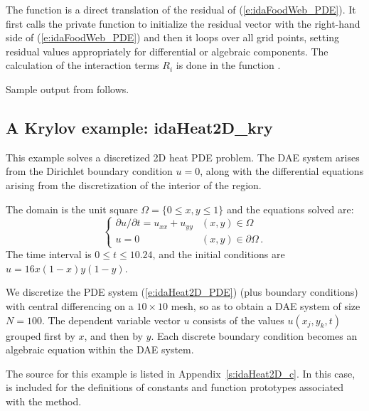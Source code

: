 The function  is a direct translation of the residual of
(\ref{e:idaFoodWeb_PDE}).  It first calls the private function  to
initialize the residual vector with the right-hand side of (\ref{e:idaFoodWeb_PDE})
and then it loops over all grid points, setting residual values appropriately for 
differential or algebraic components. The calculation of the interaction terms
$R_i$ is done in the function .


Sample output from  follows.


\subsection{A Krylov example: idaHeat2D\_kry}\label{ss:idaHeat2D}

This example solves a discretized 2D heat PDE problem. The DAE system
arises from the Dirichlet boundary condition $u = 0$, along with the 
differential equations arising from the discretization of the interior 
of the region. 

The domain is the unit square $\Omega = \{ 0 \le x,y \le 1 \}$ and the
equations solved are:
\begin{equation}\label{e:idaHeat2D_PDE}
\begin{cases}
  \partial u / \partial t = u_{xx} + u_{yy}  & (x,y) \in \Omega \\
  u = 0 & (x,y) \in \partial\Omega\, .
\end{cases}
\end{equation}
The time interval is $0 \leq t \leq 10.24$, and the initial conditions are 
$u = 16x(1-x)y(1-y)$.

We discretize the PDE system (\ref{e:idaHeat2D_PDE}) (plus boundary conditions)
with central differencing on a $10 \times 10$ mesh, so as to obtain a
DAE system of size $N = 100$.  The dependent variable vector $u$
consists of the values $u(x_j,y_k,t)$ grouped first by $x$, and then
by $y$.  Each discrete boundary condition becomes an algebraic equation
within the DAE system.

The source for this example is listed in Appendix~\ref{s:idaHeat2D_c}.
In this case,  is included for the definitions of
constants and function prototypes associated with the {\spgmr} method.

